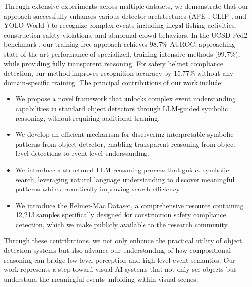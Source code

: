 Through extensive experiments across multiple datasets, we demonstrate that our approach successfully enhances various detector architectures (APE \cite{shen2024aligning}, GLIP \cite{li2022grounded}, and YOLO-World \cite{cheng2024yolo}) to recognize complex events including illegal fishing activities, construction safety violations, and abnormal crowd behaviors. In the UCSD Ped2 benchmark \cite{wang2010anomaly}, our training-free approach achieves 98.7\% AUROC, approaching state-of-the-art performance of specialized, training-intensive methods (99.7\%), while providing fully transparent reasoning. For safety helmet compliance detection, our method improves recognition accuracy by 15.77\% without any domain-specific training.
%
The principal contributions of our work include:
\begin{itemize}
    \item We propose a novel framework that unlocks complex event understanding capabilities in standard object detectors through LLM-guided symbolic reasoning, without requiring additional training.
    \item We develop an efficient mechanism for discovering interpretable symbolic patterns from object detector, enabling transparent reasoning from object-level detections to event-level understanding.
    \item We introduce a structured LLM reasoning process that guides symbolic search, leveraging natural language understanding to discover meaningful patterns while dramatically improving search efficiency.
    \item We introduce the Helmet-Mac Dataset, a comprehensive resource containing 12,213 samples specifically designed for construction safety compliance detection, which we make publicly available to the research community.
\end{itemize}
%
Through these contributions, we not only enhance the practical utility of object detection systems but also advance our understanding of how compositional reasoning can bridge low-level perception and high-level event semantics. Our work represents a step toward visual AI systems that not only see objects but understand the meaningful events unfolding within visual scenes.